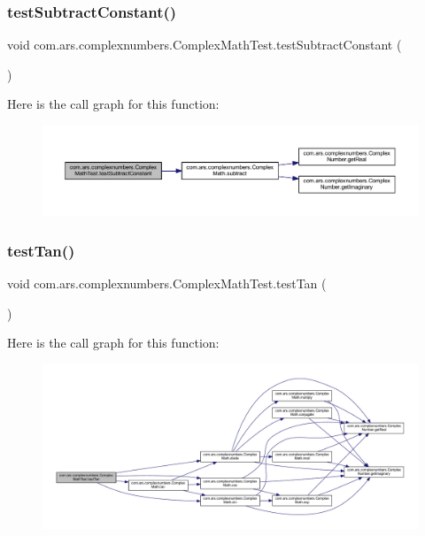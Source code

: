 \subsubsection{\texorpdfstring{test\+Subtract\+Constant()}{testSubtractConstant()}}
{\footnotesize\ttfamily void com.\+ars.\+complexnumbers.\+Complex\+Math\+Test.\+test\+Subtract\+Constant (\begin{DoxyParamCaption}{ }\end{DoxyParamCaption})}

Here is the call graph for this function\+:\nopagebreak
\begin{figure}[H]
\begin{center}
\leavevmode
\includegraphics[width=350pt]{classcom_1_1ars_1_1complexnumbers_1_1_complex_math_test_a535b2562407e9de2c6aea700d5e1a0f8_cgraph}
\end{center}
\end{figure}
\hypertarget{classcom_1_1ars_1_1complexnumbers_1_1_complex_math_test_abcec8968bf43093a912ba2c24f4718a9}{}\label{classcom_1_1ars_1_1complexnumbers_1_1_complex_math_test_abcec8968bf43093a912ba2c24f4718a9} 
\subsubsection{\texorpdfstring{test\+Tan()}{testTan()}}
{\footnotesize\ttfamily void com.\+ars.\+complexnumbers.\+Complex\+Math\+Test.\+test\+Tan (\begin{DoxyParamCaption}{ }\end{DoxyParamCaption})}

Here is the call graph for this function\+:\nopagebreak
\begin{figure}[H]
\begin{center}
\leavevmode
\includegraphics[width=350pt]{classcom_1_1ars_1_1complexnumbers_1_1_complex_math_test_abcec8968bf43093a912ba2c24f4718a9_cgraph}
\end{center}
\end{figure}


